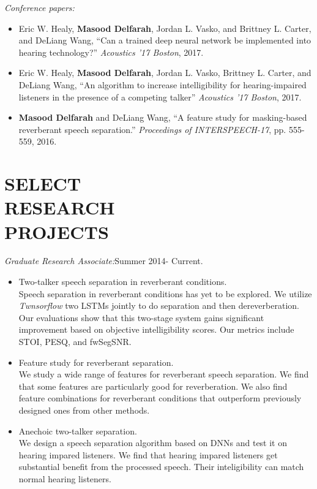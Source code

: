 \documentclass[margin, 10pt]{res}
\begin{document}
\begin{resume}
\textit{Conference papers:}\\
\begin{itemize}
\item Eric W. Healy, \textbf{Masood Delfarah}, Jordan L. Vasko, and Brittney L. Carter, and DeLiang Wang, ``Can a trained deep neural network be implemented into hearing technology?'' \textit{Acoustics ’17 Boston}, 2017.
\item Eric W. Healy, \textbf{Masood Delfarah}, Jordan L. Vasko, Brittney L. Carter, and DeLiang Wang, ``An algorithm to increase intelligibility for hearing-impaired listeners in the presence of a competing talker'' \textit{Acoustics ’17 Boston}, 2017.
\item \textbf{Masood Delfarah} and DeLiang Wang, ``A feature study for masking-based reverberant speech separation.'' \textit{Proceedings of INTERSPEECH-17}, pp. 555-559, 2016.
\end{itemize}

\section{SELECT \\ RESEARCH \\ PROJECTS}
\textit{Graduate Research Associate:}\hfill Summer 2014- Current. \\
\begin{itemize}
\item Two-talker speech separation in reverberant conditions.\\
Speech separation in reverberant conditions has yet to be explored. We utilize \textit{Twnsorflow} two LSTMs jointly to do separation and then dereverberation. Our evaluations show that this two-stage system gains significant improvement based on objective intelligibility scores. Our metrics include STOI, PESQ, and fwSegSNR.
\item Feature study for reverberant separation.\\
We study a wide range of features for reverberant speech separation. We find that some features are particularly good for reverberation. We also find feature combinations for reverberant conditions that outperform previously designed ones from other methods.
\item Anechoic two-talker separation.\\
We design a speech separation algorithm based on DNNs and test it on hearing impared listeners. We find that hearing impared listeners get substantial benefit from the processed speech. Their inteligibility can match normal hearing listeners.
\end{itemize}


\end{resume}
\end{document}
